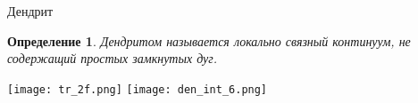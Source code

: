 \documentclass[aspectratio=1610, 10pt, notheorems]{beamer}
\newtheorem{theorem}     {Теорема}
\newtheorem{definition}  {Определение}
\begin{document}
%


\begin{frame}{Дендрит}
\begin{definition} 
Дендритом называется локально связный континуум, не содержащий простых замкнутых дуг.
\end{definition}

\texttt{[image: tr\_2f.png]}
\hfill
\texttt{[image: den\_int\_6.png]}

\end{frame}
\end{document}
